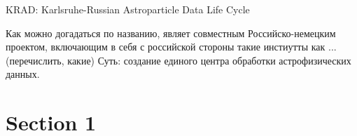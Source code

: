 \documentclass[18pt]{beamer}
\begin{document}
%
%

\begin{frame}{\textcolor{kit-green100}{KRAD}: \textcolor{kit-green100}{K}arlsruhe-\textcolor{kit-green100}{R}ussian \textcolor{kit-green100}{A}stroparticle \textcolor{kit-green100}{D}ata Life Cycle}

Как можно догадаться по названию, являет совместным Российско-немецким проектом, включающим в себя с российской стороны такие инстиутты как ... (перечислить, какие)
Суть: создание единого центра обработки астрофизических данных.

\end{frame}


\section{Section 1}
\end{document}
